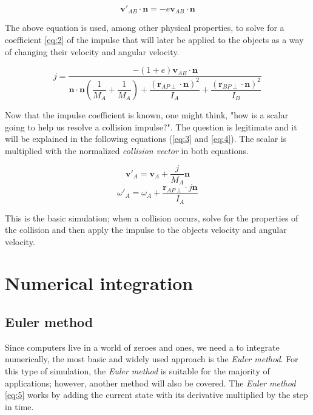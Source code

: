 \documentclass[a4paper,12pt]{report}
\begin{document}
\begin{equation}
\mathbf v'_{AB}\cdot \mathbf n=-e\mathbf v_{AB}\cdot \mathbf n
\label{eq:1}
\end{equation}

The above equation is used, among other physical properties, to solve for a coefficient \ref{eq:2} of the impulse that will later be applied to the objects as a way of changing their velocity and angular velocity.

\begin{equation}
j = \dfrac{ -(1+e) \mathbf v_{AB} \cdot \mathbf n }{
    \mathbf n \cdot \mathbf n ( \dfrac{1}{M_{A}} + \dfrac{1}{M_{A}} )
    + \dfrac{ (\mathbf r_{AP\perp} \cdot \mathbf n)^2}{I_{A} }
    + \dfrac{ (\mathbf r_{BP\perp} \cdot \mathbf n)^2}{I_{B} } }
\label{eq:2}
\end{equation}

Now that the impulse coefficient is known, one might think, "how is a scalar going to help us resolve a collision impulse?". The question is legitimate and it will be explained in the following equations (\ref{eq:3} and \ref{eq:4}). The scalar is multiplied with the normalized \emph{collision vector} in both equations.

\begin{equation}
\mathbf v'_{A}=\mathbf v_{A}+\dfrac{j}{M_{A}}\mathbf n
\label{eq:3}
\end{equation}
\begin{equation}
\omega'_{A}=\omega_{A}+\dfrac{\mathbf r_{AP\perp}\cdot j\mathbf n}{I_{A}}
\label{eq:4}
\end{equation}

This is the basic simulation; when a collision occurs, solve for the properties of the collision and then apply the impulse to the objects velocity and angular velocity.

\section{Numerical integration}

\subsection{Euler method}

Since computers live in a world of zeroes and ones, we need a to integrate numerically, the most basic and widely used approach is the \emph{Euler method}\cite{gdm}. For this type of simulation, the \emph{Euler method} is suitable for the majority of applications; however, another method will also be covered. The \emph{Euler method} \ref{eq:5} works by adding the current state with its derivative multiplied by the step in time.
\end{document}
